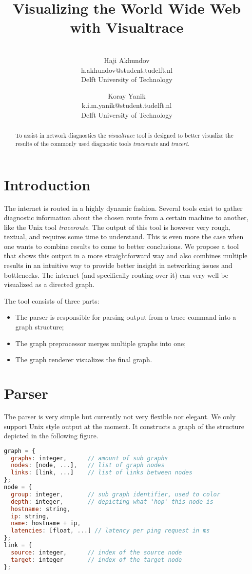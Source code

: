 \documentclass[a4paper,10pt]{article}
\title{Visualizing the World Wide Web with Visualtrace}
\author{\\Haji Akhundov\\h.akhundov@student.tudelft.nl\\ Delft University of Technology \and Koray Yanik\\k.i.m.yanik@student.tudelft.nl\\ Delft University of Technology}
\begin{document}
\maketitle

\begin{abstract}
To assist in network diagnostics the \emph{visualtrace} tool is designed to better visualize the results of the commonly used diagnostic tools \emph{traceroute} and \emph{tracert}.
\end{abstract}

\section{Introduction}
The internet is routed in a highly dynamic fashion. Several tools exist to gather diagnostic information about the chosen route from a certain machine to another, like the Unix tool \emph{traceroute}. The output of this tool is however very rough, textual, and requires some time to understand. This is even more the case when one wants to combine results to come to better conclusions. We propose a tool that shows this output in a more straightforward way and also combines multiple results in an intuitive way to provide better insight in networking issues and bottlenecks. The internet (and specifically routing over it) can very well be visualized as a directed graph.

The tool consists of three parts:
\begin{itemize}
\item The parser is responsible for parsing output from a trace command into a graph structure;
\item The graph preprocessor merges multiple graphs into one;
\item The graph renderer visualizes the final graph.
\end{itemize}

\section{Parser}
The parser is very simple but currently not very flexible nor elegant. We only support Unix style output at the moment. It constructs a graph of the structure depicted in the following figure.

\begin{lstlisting}[language=JavaScript]
graph = {
  graphs: integer,      // amount of sub graphs
  nodes: [node, ...],   // list of graph nodes
  links: [link, ...]    // list of links between nodes
};
node = {
  group: integer,       // sub graph identifier, used to color
  depth: integer,       // depicting what 'hop' this node is
  hostname: string,
  ip: string,
  name: hostname + ip,
  latencies: [float, ...] // latency per ping request in ms
};
link = {
  source: integer,      // index of the source node
  target: integer       // index of the target node
};
\end{lstlisting}
\end{document}
